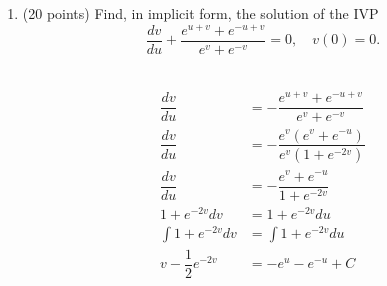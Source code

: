 \documentclass{article}
\newcommand{\nc}{\normalcolor}
\begin{document}
\begin{enumerate}
\newpage

\item (20 points) Find, in implicit form, the solution of the IVP 
\begin{equation*}
\frac{dv}{du} + \frac{e^{u+v} + e^{-u+v}}{e^v+e^{-v}} = 0, \quad v(0) = 0.
\end{equation*}
\nc

\\
\begin{align*}
	\dfrac{dv}{du} &= -\dfrac{e^{u+v}+e^{-u+v}}{e^v+e^{-v}}\\
	\dfrac{dv}{du} &= -\dfrac{e^v(e^{v}+e^{-u})}{e^v(1+e^{-2v})}\\
	\dfrac{dv}{du} &= -\dfrac{e^{v}+e^{-u}}{1+e^{-2v}}\\
	1+e^{-2v} dv &= 1+e^{-2v} du\\
	\int 1+e^{-2v} dv &= \int 1+e^{-2v} du\\
	v - \dfrac{1}{2}e^{-2v} &= -e^{u}-e^{-u}+C 
\end{align*}
\end{enumerate}
\end{document}
